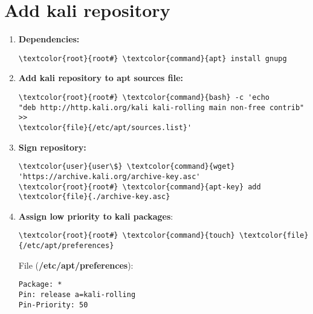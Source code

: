 \documentclass[10pt, a4paper, onecolumn, openany]{book} %
\begin{document}
\section{Add kali repository}
\begin{enumerate}
    \item \textbf{Dependencies:}
\begin{Verbatim}[commandchars=\\\{\}]
\textcolor{root}{root#} \textcolor{command}{apt} install gnupg
\end{Verbatim}    
    \item \textbf{Add kali repository to apt sources file:}
\begin{Verbatim}[commandchars=\\\{\}]
\textcolor{root}{root#} \textcolor{command}{bash} -c 'echo 
"deb http://http.kali.org/kali kali-rolling main non-free contrib" >> 
\textcolor{file}{/etc/apt/sources.list}'
\end{Verbatim}    
    \item \textbf{Sign repository:}
\begin{Verbatim}[commandchars=\\\{\}]
\textcolor{user}{user\$} \textcolor{command}{wget} 'https://archive.kali.org/archive-key.asc'
\textcolor{root}{root#} \textcolor{command}{apt-key} add \textcolor{file}{./archive-key.asc}
\end{Verbatim}    
    \item \textbf{Assign low priority to kali packages}:
\begin{Verbatim}[commandchars=\\\{\}]
\textcolor{root}{root#} \textcolor{command}{touch} \textcolor{file}{/etc/apt/preferences}
\end{Verbatim}
File (\textbf{\textcolor{file}{/etc/apt/preferences}}):
\begin{Verbatim}[commandchars=\\\{\}]
Package: *
Pin: release a=kali-rolling
Pin-Priority: 50
\end{Verbatim}
\end{enumerate}
\end{document}
